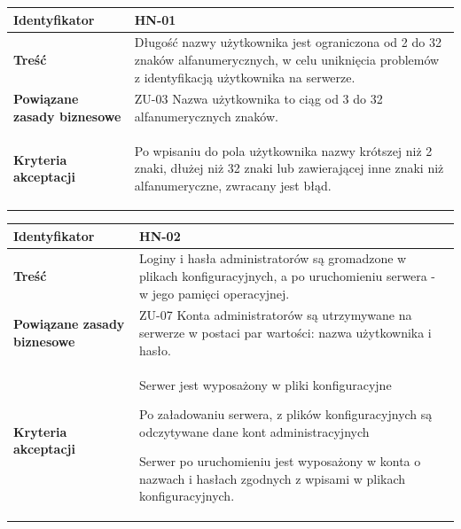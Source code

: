 \begin{tabular}{ | l | l | }
	\hline
		\textbf{Identyfikator} &
		HN-01
		\\

	\hline
		\textbf{Treść} & \parbox[t]{13cm}{
			Długość nazwy użytkownika jest ograniczona od 2 do 32 znaków alfanumerycznych, w celu uniknięcia problemów z identyfikacją użytkownika na serwerze.
		}\\

	\hline
		\parbox[t]{4cm}{\textbf{Powiązane zasady biznesowe}} & \parbox[t]{13cm}{
			ZU-03 Nazwa użytkownika to ciąg od 3 do 32 alfanumerycznych znaków.
		}\\

	\hline
		\parbox[t]{4cm}{\textbf{Kryteria akceptacji}} & \parbox[t]{13cm}{
			\begin{enumreq}
				\item Po wpisaniu do pola użytkownika nazwy krótszej niż 2 znaki, dłużej niż 32 znaki lub zawierającej inne znaki niż alfanumeryczne, zwracany jest błąd.
			\end{enumreq}
			}
		\\

	\hline
\end{tabular}

\vspace{2em}

\begin{tabular}{ | l | l | }
	\hline
		\textbf{Identyfikator} &
		HN-02
		\\

	\hline
		\textbf{Treść} & \parbox[t]{13cm}{
			Loginy i hasła administratorów są gromadzone w plikach
      konfiguracyjnych, a po uruchomieniu serwera - w jego
      pamięci operacyjnej.
		}\\

	\hline
		\parbox[t]{4cm}{\textbf{Powiązane zasady biznesowe}} & \parbox[t]{13cm}{
			ZU-07 Konta administratorów są utrzymywane na serwerze w postaci par wartości: nazwa użytkownika i hasło.
		}\\

	\hline
		\parbox[t]{4cm}{\textbf{Kryteria akceptacji}} & \parbox[t]{13cm}{
			\begin{enumreq}
				\item Serwer jest wyposażony w pliki konfiguracyjne
        \item Po załadowaniu serwera, z plików konfiguracyjnych
        są odczytywane dane kont administracyjnych
        \item Serwer po uruchomieniu jest wyposażony w konta o
        nazwach i hasłach zgodnych z wpisami w plikach konfiguracyjnych.
			\end{enumreq}
			}
		\\

	\hline
\end{tabular}

